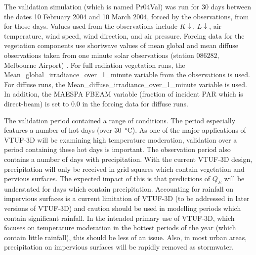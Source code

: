 \documentclass[final,3p,times,authoryear]{elsarticle}
\begin{document}
The validation simulation (which is named Pr04Val) was run for 30 days between the dates 10 February 2004 and 10 March 2004, forced by the observations, from \cite{Coutts2007} for those days. Values used from the observations include $K\downarrow$, $L\downarrow$, air temperature, wind speed, wind direction, and air pressure. Forcing data for the vegetation components use shortwave values of mean global and mean diffuse observations taken from one minute solar observations (station 086282, Melbourne Airport) \citep{BOM2016}. For full radiation vegetation runs, the Mean\_global\_irradiance\_over\_1\_minute variable from the observations is used. For diffuse runs, the Mean\_diffuse\_irradiance\_over\_1\_minute variable is used. In addition, the MAESPA FBEAM variable (fraction of incident PAR which is direct-beam) is set to 0.0 in the forcing data for diffuse runs.

The validation period contained a range of conditions. The period especially features a number of hot days (over \SI{30}{\degreeCelsius}). As one of the major applications of VTUF-3D will be examining high temperature moderation, validation over a period containing these hot days is important. The observation period also contains a number of days with precipitation. With the current VTUF-3D design, precipitation will only be received in grid squares which contain vegetation and pervious surfaces. The expected impact of this is that predictions of $Q_{E}$ will be understated for days which contain precipitation. Accounting for rainfall on impervious surfaces is a current limitation of VTUF-3D (to be addressed in later versions of VTUF-3D) and caution should be used in modelling periods which contain significant rainfall. In the intended primary use of VTUF-3D, which focuses on temperature moderation in the hottest periods of the year (which contain little rainfall), this should be less of an issue. Also, in most urban areas, precipitation on impervious surfaces will be rapidly removed as stormwater.

\end{document}
